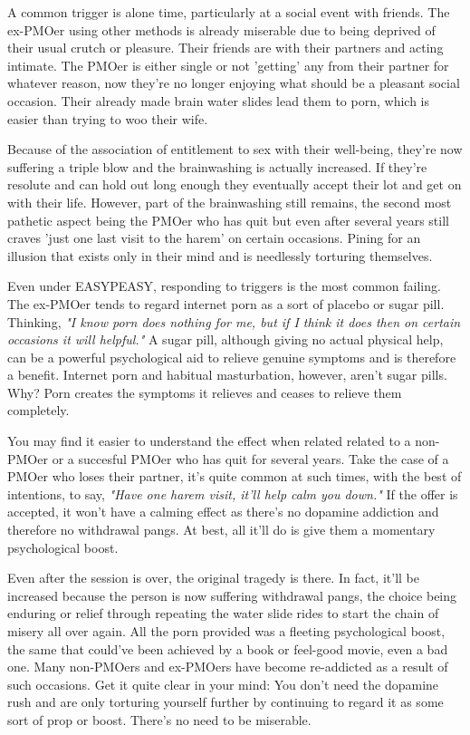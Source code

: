 \documentclass[easypeasy.tex]{subfiles}
\begin{document}
A common trigger is alone time, particularly at a social event with friends. The ex-PMOer using other methods is already miserable due to being deprived of their usual crutch or pleasure. Their friends are with their partners and acting intimate. The PMOer is either single or not 'getting' any from their partner for whatever reason, now they're no longer enjoying what should be a pleasant social occasion. Their already made brain water slides lead them to porn, which is easier than trying to woo their wife.

Because of the association of entitlement to sex with their well-being, they're now suffering a triple blow and the brainwashing is actually increased. If they're resolute and can hold out long enough they eventually accept their lot and get on with their life. However, part of the brainwashing still remains, the second most pathetic aspect being the PMOer who has quit but even after several years still craves 'just one last visit to the harem' on certain occasions. Pining for an illusion that exists only in their mind and is needlessly torturing themselves.

Even under EASYPEASY, responding to triggers is the most common failing. The ex-PMOer tends to regard internet porn as a sort of placebo or sugar pill. Thinking, \textit{"I know porn does nothing for me, but if I think it does then on certain occasions it will helpful."} A sugar pill, although giving no actual physical help, can be a powerful psychological aid to relieve genuine symptoms and is therefore a benefit. Internet porn and habitual masturbation, however, aren't sugar pills. Why? Porn creates the symptoms it relieves and ceases to relieve them completely.

You may find it easier to understand the effect when related related to a non-PMOer or a succesful PMOer who has quit for several years. Take the case of a PMOer who loses their partner, it's quite common at such times, with the best of intentions, to say, \textit{"Have one harem visit, it'll help calm you down."} If the offer is accepted, it won't have a calming effect as there's no dopamine addiction and therefore no withdrawal pangs. At best, all it'll do is give them a momentary psychological boost.

Even after the session is over, the original tragedy is there. In fact, it'll be increased because the person is now suffering withdrawal pangs, the choice being enduring or relief through repeating the water slide rides to start the chain of misery all over again. All the porn provided was a fleeting psychological boost, the same that could've been achieved by a book or feel-good movie, even a bad one. Many non-PMOers and ex-PMOers have become re-addicted as a result of such occasions. Get it quite clear in your mind: You don't need the dopamine rush and are only torturing yourself further by continuing to regard it as some sort of prop or boost. There's no need to be miserable.
\end{document}

